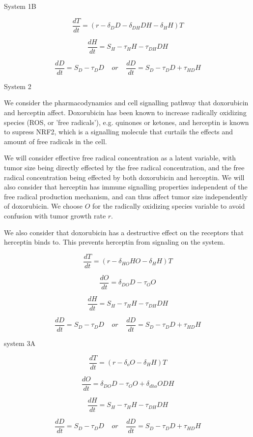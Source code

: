 \documentclass{article}
\begin{document}
System 1B

$$ \frac{dT}{dt} = ( r - \delta_D D - \delta_{DH} D H - \delta_H H ) T  $$


$$ \frac{dH}{dt} = S_H - \tau_H H - \tau_{DH} D H $$


$$ \frac{dD}{dt} = S_D - \tau_D D
\;\;\;\;
or
\;\;\;\;
\frac{dD}{dt} = S_D - \tau_D D + \tau_{HD} H 
$$



System 2

We consider the pharmacodynamics and cell signalling pathway that doxorubicin and herceptin affect. Doxorubicin has been known to increase radically oxidizing species (ROS, or 'free radicals'), e.g. quinones or ketones, and herceptin is known to supress NRF2, which is a signalling molecule that curtails the effects and amount of free radicals in the cell.  


We will consider effective free radical concentration as a latent variable, with tumor size being directly effected by the free radical concentration, and the free radical concentration being effected by both doxorubicin and herceptin. We will also consider that herceptin has immune signalling properties independent of the free radical production mechanism, and can thus affect tumor size independently of doxorubicin. We choose $O$ for the radically oxidizing species variable to avoid confusion with tumor growth rate $r$.


We also consider that doxorubicin has a destructive effect on the receptors that herceptin binds to. This prevents herceptin from signaling on the system.



$$ \frac{dT}{dt} = (r - \delta_{HO} H O - \delta_H H ) T $$


$$ \frac{dO}{dt} = \delta_{DO} D - \tau_O O $$


$$ \frac{dH}{dt} = S_H - \tau_H H - \tau_{DH} D H $$


$$ 
\frac{dD}{dt} = S_D - \tau_D D
\;\;\;\;
or 
\;\;\;\;
\frac{dD}{dt} = S_D - \tau_D D + \tau_{HD} H 
$$





system 3A


$$ \frac{dT}{dt} = (r - \delta_o O - \delta_H H ) T $$


$$ \frac{dO}{dt} = \delta_{DO} D - \tau_O O + \delta_{dho} O D H $$


$$ \frac{dH}{dt} = S_H - \tau_H H - \tau_{DH} D H $$


$$ \frac{dD}{dt} = S_D - \tau_D D
\;\;\;\;
or 
\;\;\;\;
\frac{dD}{dt} = S_D - \tau_D D + \tau_{HD} H 
$$
\end{document}
